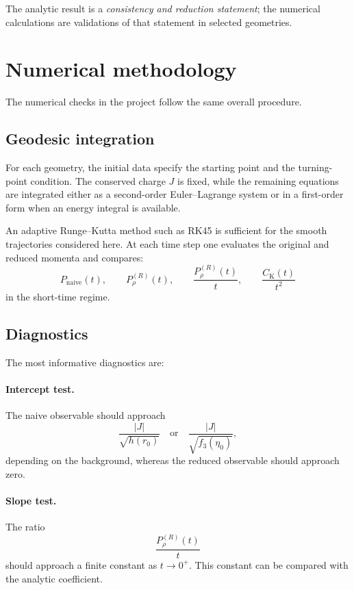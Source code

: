 \documentclass[11pt,a4paper]{article}
\theoremstyle{plain}
\theoremstyle{definition}
\theoremstyle{remark}
\newcommand{\PrhoR}{P_\rho^{(R)}}
\newcommand{\Ck}{C_{\mathrm K}}
\begin{document}
The analytic result is a \emph{consistency and reduction statement}; the numerical calculations are validations of that statement in selected geometries.

\section{Numerical methodology}
\label{sec:numerics}

The numerical checks in the project follow the same overall procedure.

\subsection{Geodesic integration}

For each geometry, the initial data specify the starting point and the turning-point condition. The conserved charge $J$ is fixed, while the remaining equations are integrated either as a second-order Euler--Lagrange system or in a first-order form when an energy integral is available.

An adaptive Runge--Kutta method such as RK45 is sufficient for the smooth trajectories considered here. At each time step one evaluates the original and reduced momenta and compares:
\begin{equation*}
P_{\mathrm{naive}}(t),
\qquad
\PrhoR(t),
\qquad
\frac{\PrhoR(t)}{t},
\qquad
\frac{\Ck(t)}{t^2}
\end{equation*}
in the short-time regime.

\subsection{Diagnostics}

The most informative diagnostics are:

\paragraph{Intercept test.}
The naive observable should approach
\begin{equation*}
\frac{|J|}{\sqrt{h(r_0)}}
\quad\text{or}\quad
\frac{|J|}{\sqrt{f_3(\eta_0)}},
\end{equation*}
depending on the background, whereas the reduced observable should approach zero.

\paragraph{Slope test.}
The ratio
\begin{equation*}
\frac{\PrhoR(t)}{t}
\end{equation*}
should approach a finite constant as $t\to0^+$. This constant can be compared with the analytic coefficient.
\end{document}
